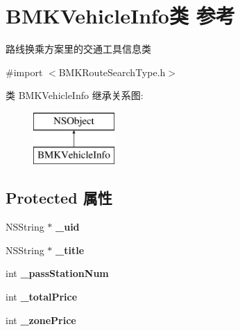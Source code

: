 \hypertarget{interface_b_m_k_vehicle_info}{}\section{B\+M\+K\+Vehicle\+Info类 参考}
\label{interface_b_m_k_vehicle_info}


路线换乘方案里的交通工具信息类  




{\ttfamily \#import $<$B\+M\+K\+Route\+Search\+Type.\+h$>$}

类 B\+M\+K\+Vehicle\+Info 继承关系图\+:\begin{figure}[H]
\begin{center}
\leavevmode
\includegraphics[height=2.000000cm]{interface_b_m_k_vehicle_info}
\end{center}
\end{figure}
\subsection*{Protected 属性}
\begin{DoxyCompactItemize}
\item 
\hypertarget{interface_b_m_k_vehicle_info_a853ee3a522e8444b9971b49488e8400b}{}N\+S\+String $\ast$ {\bfseries \+\_\+uid}\label{interface_b_m_k_vehicle_info_a853ee3a522e8444b9971b49488e8400b}

\item 
\hypertarget{interface_b_m_k_vehicle_info_a1595d93dc64551a2aecb711a5f1beeb7}{}N\+S\+String $\ast$ {\bfseries \+\_\+title}\label{interface_b_m_k_vehicle_info_a1595d93dc64551a2aecb711a5f1beeb7}

\item 
\hypertarget{interface_b_m_k_vehicle_info_a249d923d79203f1a3a0a24edbde42e4f}{}int {\bfseries \+\_\+pass\+Station\+Num}\label{interface_b_m_k_vehicle_info_a249d923d79203f1a3a0a24edbde42e4f}

\item 
\hypertarget{interface_b_m_k_vehicle_info_af5ed718d348fa9a5763afeb849195415}{}int {\bfseries \+\_\+total\+Price}\label{interface_b_m_k_vehicle_info_af5ed718d348fa9a5763afeb849195415}

\item 
\hypertarget{interface_b_m_k_vehicle_info_a4357a0dd3f52b78a01df9f68199fb81d}{}int {\bfseries \+\_\+zone\+Price}\label{interface_b_m_k_vehicle_info_a4357a0dd3f52b78a01df9f68199fb81d}

\end{DoxyCompactItemize}

